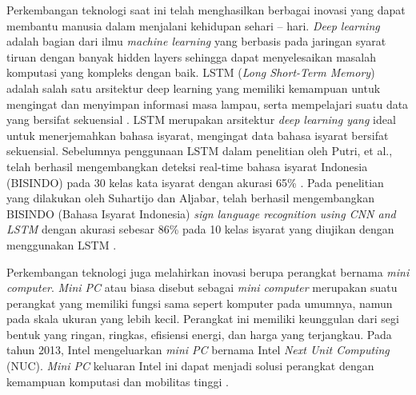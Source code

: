 Perkembangan teknologi saat ini telah menghasilkan berbagai inovasi yang dapat membantu manusia dalam menjalani kehidupan sehari – hari. \emph{Deep learning} adalah bagian dari ilmu \emph{machine learning} yang berbasis pada jaringan syarat tiruan dengan banyak hidden layers sehingga dapat menyelesaikan masalah komputasi yang kompleks dengan baik. LSTM (\emph{Long Short-Term Memory}) adalah salah satu arsitektur deep learning yang memiliki kemampuan untuk mengingat dan menyimpan informasi masa lampau, serta mempelajari suatu data yang bersifat sekuensial \parencite{sadli2020}. LSTM merupakan arsitektur \emph{deep learning yang} ideal untuk menerjemahkan bahasa isyarat, mengingat data bahasa isyarat bersifat sekuensial. Sebelumnya penggunaan LSTM dalam penelitian oleh Putri, et al., telah berhasil mengembangkan deteksi real-time bahasa isyarat Indonesia (BISINDO) pada 30 kelas kata isyarat dengan akurasi 65\% \parencite{putri2022}. Pada penelitian yang dilakukan oleh Suhartijo dan Aljabar, telah berhasil mengembangkan BISINDO (Bahasa Isyarat Indonesia) \emph{sign language recognition using CNN and LSTM} dengan akurasi sebesar 86\% pada 10 kelas isyarat yang diujikan dengan menggunakan LSTM \parencite{aljabar2020}. 

Perkembangan teknologi juga melahirkan inovasi berupa perangkat bernama \emph{mini computer}. \emph{Mini PC} atau biasa disebut sebagai \emph{mini computer} merupakan suatu perangkat yang memiliki fungsi sama sepert komputer pada umumnya, namun pada skala ukuran yang lebih kecil. Perangkat ini memiliki keunggulan dari segi bentuk yang ringan, ringkas, efisiensi energi, dan harga yang terjangkau. Pada tahun 2013, Intel mengeluarkan \emph{mini PC} bernama Intel \emph{Next Unit Computing} (NUC). \emph{Mini PC} keluaran Intel ini dapat menjadi solusi perangkat dengan kemampuan komputasi dan mobilitas tinggi \parencite{minny2023}. 



